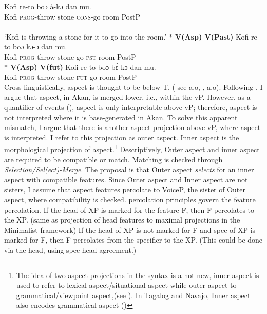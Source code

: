 \documentclass[output=paper,colorlinks,citecolor=brown]{langscibook}
\begin{document}
\ea\label{ex041} 
\gll Kofi re-to boɔ \`a-kɔ dan mu.\\
	Kofi \textsc{prog}-throw stone \textsc{cons}-go room PostP\\
	 \\
\glt `Kofi is throwing a stone for it to go into the room.'
\z 
\ex\label{ex051}
\textbf{$\ast$ \phantom {} {} {}  V(Asp)\phantom {} {} {}   V(Past)} 
     \ea\label{ex7} 
\gll * Kofi re-to boɔ kɔ-ɔ dan mu.\\
	{} Kofi \textsc{prog}-throw  stone  go-\textsc{pst} room PostP\\
\z 
\ex\label{ex061}
\textbf{$\ast$ \phantom {} {} {}  V(Asp)\phantom {} {} {}   V(fut)} 
     \ea\label{ex1} 
\gll * Kofi re-to boɔ  b\`{ɛ}-kɔ dan mu.\\
	{} Kofi \textsc{prog}-throw stone  \textsc{fut}-go room PostP\\

\z 
\z \z Cross-linguistically, aspect is thought to be below T, ( see \citet{Rizzi2004} \citet{Rizzi2013Notes} a.o, \citet{Cinque2002, Cinque2006}, \citet{RizziCinque2016} \citet{CinqueRizzi2010} a.o). Following \citet{Kandybowicz2010, Kandybowicz2015}, I argue that aspect, in Akan, is merged lower, i.e., within the vP.  However, as a quantifier of events (\citet{Hacquard2006}), aspect is only interpretable above vP; therefore, aspect is not interpreted where it is base-generated in Akan. To solve this apparent mismatch, I argue that there is another aspect projection above vP, where aspect is interpreted. I refer to this projection as outer aspect. Inner aspect is the morphological projection of aspect.\footnote{The idea of two aspect projections in the syntax is a not new, inner aspect is used to refer to lexical aspect/situational aspect while outer aspect to grammatical/viewpoint aspect,(see \citealt{Travis2010, Travis1991, Smith1991, MacDonald2006}). In Tagalog and Navajo, Inner aspect also encodes grammatical aspect (\citet{Travis2010})} Descriptively, Outer aspect and inner aspect are required to be compatible or match. Matching is checked through \textit{Selection/Sel(ect)-Merge}. The proposal is that Outer aspect \textit{selects} for an inner aspect with compatible features. Since Outer aspect and Inner aspect are not sisters, 
I assume that aspect features percolate to VoiceP, the sister of Outer aspect, where compatibility is checked.  percolation principles govern the feature percolation. \nocite{Webelhuth1992}
\ea \label{ex16}
\ea If the head of XP is marked for the feature F, then F percolates to the XP. (same as projection of head features to maximal projections in the Minimalist framework)
\ex If the head of XP is not marked for F and spec of XP is marked for F, then F percolates from the specifier to the XP. (This could be done via the head, using spec-head agreement.)
\end{document}
